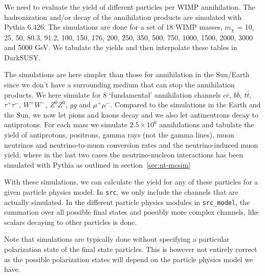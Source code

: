 \documentclass[a4paper,10pt,oneside]{book}
\newcommand{\ds}{{\sffamily DarkSUSY}}
\begin{document}
We need to evaluate the yield of different particles per WIMP annihilation.
The hadronization and/or decay of the annihilation products are
simulated with {\sc Pythia} \cite{Sjostrand:2006za} 6.426.
The simulations are done for a set of 18 WIMP
masses, $m_{\chi}$ = 10, 25, 50, 80.3, 91.2, 100, 150, 176, 200, 250,
350, 500, 750, 1000, 1500, 2000, 3000 and 5000 GeV\@. We tabulate the
yields and then interpolate these tables in \ds.

     The simulations are here
     simpler than those for annihilation in the Sun/Earth
    since we don't have a surrounding medium that can stop the
     annihilation products.  We here simulate for 8 `fundamental'
     annihilation channels $c\bar{c}$, $b\bar{b}$,
     $t\bar{t}$, $\tau^+\tau^-$, $W^+W^-$, $Z^0 Z^{0}$, $g g$ and
     $\mu^{+} \mu^{-}$. Compared to the simulations in the Earth and
     the Sun, we now let pions and kaons decay and we also let
     antineutrons decay to antiprotons. For each mass we simulate
     $2.5 \times 10^{6}$ annihilations and tabulate the yield of
     antiprotons, positrons, gamma rays (not the gamma lines),
     muon neutrinos and neutrino-to-muon conversion rates and the
     neutrino-induced muon yield, where in the last two cases the
     neutrino-nucleon interactions has been simulated with {\sc
     Pythia} as outlined in section~\ref{sec:nt-mcsim}


With these simulations, we can calculate the yield for any of these
particles for a given particle physics model. In \texttt{src}, we only include the channels that are actually simulated. In the different particle physics modules in \texttt{src\_model}, the summation over all possible final states and possibly more complex channels, like scalars decaying to other particles is done.

Note that simulations are typically done without specifying a particular polarization state of the final state particles. This is however not entirely correct as the possible polarization states will depend on the particle physics model we have. 
\end{document}
